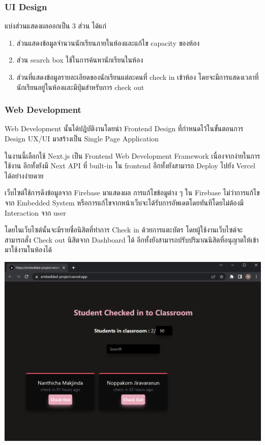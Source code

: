 \documentclass[fontsize=14pt]{extarticle}
\begin{document}
\subsubsection{UI Design}
แบ่งส่วนแสดงผลออกเป็น 3 ส่วน ได้แก่
\begin{enumerate}
    \item ส่วนแสดงข้อมูลจำนวนนักเรียนภายในห้องและแก้ไข capacity ของห้อง
    \item ส่วน search box ใช้ในการค้นหานักเรียนในห้อง
    \item ส่วนที่แสดงข้อมูลรายละเอียดของนักเรียนแต่ละคนที่ check in เข้าห้อง โดยจะมีการแสดงเวลาที่นักเรียนอยู่ในห้องและมีปุ่มสำหรับการ check out
\end{enumerate}
\subsubsection{Web Development}
\par Web Development นั้นได้ปฎิบัติงานโดยนำ Frontend Design ที่กำหนดไว้ในขั้นตอนการ
Design UX/UI มาสร้างเป็น Single Page Application
\par ในงานนี้เลือกใช้ Next.js เป็น Frontend Web Development Framework
เนื่องจากง่ายในการใช้งาน อีกทั้งยังมี Next API ที่ built-in ใน frontend
อีกทั้งยังสามารถ Deploy ไปยัง Vercel ได้อย่างง่ายดาย
\par เว็บไซต์ใช้การดึงข้อมูลจาก Firebase มาแสดงผล การแก้ไขข้อมูต่าง ๆ ใน Firebase
ไม่ว่าการแก้ไขจาก Embedded System หรือการแก้ไขจากหน้าเว็บจะได้รับการอัพเดตโดยทันทีโดยไม่ต้องมี
Interaction จาก user
\par โดยในเว็บไซต์นั้นจะมีรายชื่อนิสิตที่ทำการ Check in ด้วยการแตะบัตร
โดยผู้ใช้งานเว็บไซต์จะสามารถสั่ง Check out นิสิตจาก Dashboard ได้
อีกทั้งยังสามารถปรับปริมาณนิสิตที่อนุญาตให้เข้ามาใช้งานในห้องได้
\begin{center}
    \includegraphics[width=\textwidth]{Web.png}
\end{center}
\pagebreak
\end{document}
